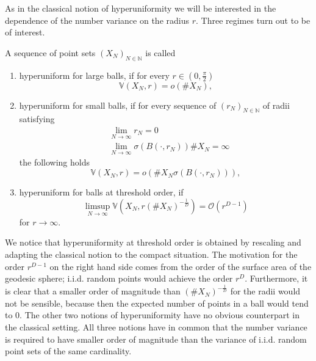 As in
the classical notion of hyperuniformity we will be interested in the dependence
of the number variance on the radius $r$. Three regimes turn out to be of
interest.
\begin{definition} \label{def:hyperuniformity.projective.space}
  A sequence of point sets $(X_N)_{N\in\mathbb{N}}$ is called
  \begin{enumerate}
  \item hyperuniform for large balls, if for every $r\in(0,\frac\pi2)$
    \begin{equation*}
      \mathbb{V}(X_N,r)=o\left(\#X_N\right),
    \end{equation*}
  \item hyperuniform for small balls, if for every sequence of
    $(r_N)_{N\in\mathbb{N}}$ of radii satisfying
    \begin{align*}
      &\lim_{N\to\infty}r_N=0\\
      &\lim_{N\to\infty}\sigma(B(\cdot,r_N))\#X_N=\infty
    \end{align*}
    the following holds
    \begin{equation*}
      \mathbb{V}(X_N,r)=o\left(\#X_N\sigma(B(\cdot,r_N))\right),
    \end{equation*}
  \item hyperuniform for balls at threshold order, if
    \begin{equation*}
      \limsup_{N\to\infty}\mathbb{V}(X_N,r(\#X_N)^{-\frac1D})=\mathcal{O}(r^{D-1})
    \end{equation*}
    for $r\to\infty$.
  \end{enumerate}
\end{definition}
We notice that hyperuniformity at threshold order is obtained by rescaling and
adapting the classical notion to the compact situation. The motivation for the
order $r^{D-1}$ on the right hand side comes from the order of the surface area
of the geodesic sphere; i.i.d. random points would achieve the order
$r^D$. Furthermore, it is clear that a smaller order of magnitude than
$(\#X_N)^{-\frac1D}$ for the radii would not be sensible, because then the
expected number of points in a ball would tend to $0$.  The other two notions
of hyperuniformity have no obvious counterpart in the classical setting. All
three notions have in common that the number variance is required to have
smaller order of magnitude than the variance of i.i.d. random point sets of the
same cardinality.
